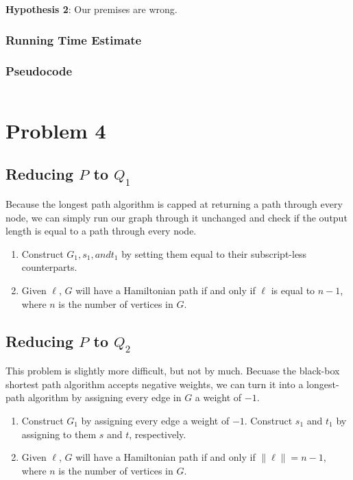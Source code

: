 \documentclass{math}
\begin{document}
\textbf{Hypothesis 2}: Our premises are wrong.  


\subsubsection*{Running Time Estimate}


\subsubsection*{Pseudocode}

\begin{lstlisting}

\end{lstlisting}


\section*{Problem 4}


\subsection*{Reducing \( P \) to \( Q_1 \)}

Because the longest path algorithm is capped at returning a path through every
node, we can simply run our graph through it unchanged and check if the output
length is equal to a path through every node.  \begin{enumerate}
\renewcommand{\theenumi}{\alph{enumi}}
    \item Construct \( G_1, s_1, and t_1 \) by setting them equal to their
        subscript-less counterparts.
    \item Given \( \ell \), \( G \) will have a Hamiltonian path if and only
        if \( \ell \) is equal to \( n - 1 \), where \( n \) is the number of
        vertices in \( G \).
\end{enumerate}

\subsection*{Reducing \( P \) to \( Q_2 \)}

This problem is slightly more difficult, but not by much.  Becuase the black-box
shortest path algorithm accepts negative weights, we can turn it into a
longest-path algorithm by assigning every edge in \( G \) a weight of \( -1 \).
\begin{enumerate}
        \renewcommand{\theenumi}{\alph{enumi}}
    \item Construct \( G_1 \) by assigning every edge a weight of \( -1 \).
        Construct $s_1$ and $t_1$ by assigning to them $s$ and $t$,
        respectively.
    \item Given \( \ell \), \( G \) will have a Hamiltonian path if and only if
        \( \|\ell\| = n - 1 \), where \( n \) is the number of vertices in \( G
        \).
\end{enumerate}
\end{document}
